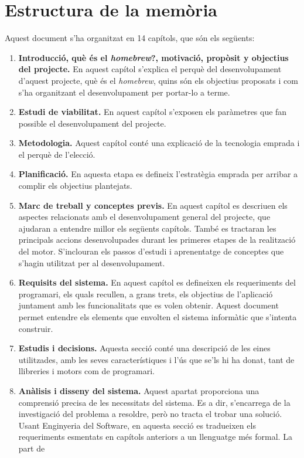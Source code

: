 \section{Estructura de la memòria}
Aquest document s’ha organitzat en 14 capítols, que són els següents:
\begin{enumerate}
  \item \textbf{Introducció, què és el \textit{homebrew}?, motivació, propòsit y objectius del projecte.} En aquest capítol s’explica el perquè del desenvolupament d’aquest projecte, què és el \textit{homebrew},
quins són els objectius proposats i com s’ha organitzant el desenvolupament
per portar-lo a terme.
\item \textbf{Estudi de viabilitat.} En aquest capítol s’exposen els paràmetres que
fan possible el desenvolupament del projecte.
\item \textbf{Metodologia.} Aquest capítol conté una explicació de la tecnologia emprada
i el perquè de l’elecció.
\item \textbf{Planificació.} En aquesta etapa es defineix l’estratègia emprada per
arribar a complir els objectius plantejats.
\item \textbf{Marc de treball y conceptes previs.} En aquest capítol es descriuen
els aspectes relacionats amb el desenvolupament general del projecte, que
ajudaran a entendre millor els següents capítols. També es tractaran
les principals accions desenvolupades durant les primeres etapes de la
realització del motor. S’inclouran els passos d’estudi i aprenentatge
de conceptes que s’hagin utilitzat per al desenvolupament.
\item \textbf{Requisits del sistema.} En aquest capítol es defineixen els requeriments
del programari, els quals recullen, a grans trets, els objectius de l’aplicació
juntament amb les funcionalitats que es volen obtenir. Aquest document
permet entendre els elements que envolten el sistema informàtic que s’intenta
construir.
\item \textbf{Estudis i decisions.} Aquesta secció conté una descripció de les eines
utilitzades, amb les seves característiques i l’ús que se’ls hi ha donat, tant
de llibreries i motors com de programari.
\item \textbf{Anàlisis i disseny del sistema.} Aquest apartat proporciona una comprensió
precisa de les necessitats del sistema. Es a dir, s’encarrega de la investigació
del problema a resoldre, però no tracta el trobar una solució. Usant
Enginyeria del Software, en aquesta secció es tradueixen els requeriments
esmentats en capítols anteriors a un llenguatge més formal. La part de

\end{enumerate}
